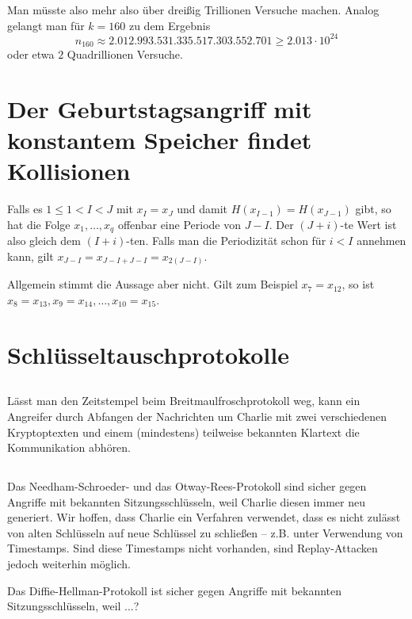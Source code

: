 \documentclass{../crypto}
\begin{document}
Man müsste also mehr also über dreißig Trillionen
Versuche machen. Analog gelangt man für $k=160$ zu dem Ergebnis 
\begin{equation*}
   n_{160} \approx 2.012.993.531.335.517.303.552.701 \ge 2.013 \cdot 10^{24}
\end{equation*}
oder etwa $2$ Quadrillionen Versuche.

\section{Der Geburtstagsangriff mit konstantem Speicher findet Kollisionen}

Falls es $1 \le 1 < I < J$ mit $x_I = x_J$ und damit $H(x_{I-1}) = H(x_{J-1})$
gibt, so hat die Folge $x_1,\ldots,x_q$ offenbar eine Periode von $J - I$. Der
$(J+i)$-te Wert ist also gleich dem $(I+i)$-ten. Falls man die Periodizität schon für $i
< I$ annehmen kann, gilt $x_{J-I} = x_{J-I + J-I} = x_{2(J-I)}$.

Allgemein stimmt die Aussage aber nicht. Gilt zum Beispiel $x_7 = x_{12}$, so
ist $x_8 = x_{13}, x_9 = x_{14},\ldots,x_{10} = x_{15}$.

\section{Schlüsseltauschprotokolle}

\subsection{}

Lässt man den Zeitstempel beim Breitmaulfroschprotokoll weg, kann ein Angreifer
durch Abfangen der Nachrichten um Charlie mit zwei verschiedenen Kryptoptexten
und einem (mindestens) teilweise bekannten Klartext die Kommunikation abhören.

\subsection{}

Das Needham-Schroeder- und das Otway-Rees-Protokoll sind sicher gegen Angriffe
mit bekannten Sitzungsschlüsseln, weil Charlie diesen immer neu generiert. Wir
hoffen, dass Charlie ein Verfahren verwendet, dass es nicht zulässt von alten
Schlüsseln auf neue Schlüssel zu schließen -- z.B.  unter Verwendung von
Timestamps. Sind diese Timestamps nicht vorhanden, sind Replay-Attacken jedoch
weiterhin möglich.

Das Diffie-Hellman-Protokoll ist sicher gegen Angriffe mit bekannten 
Sitzungsschlüsseln, weil ...?
\end{document}
